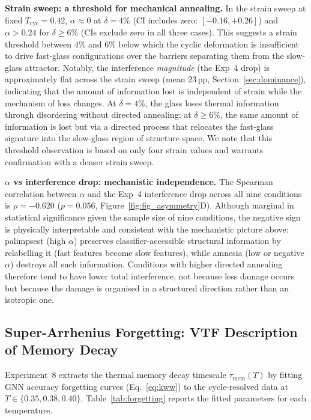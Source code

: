 \documentclass[12pt,a4paper]{article}
\newcommand{\Tbat}{T_{\mathrm{cyc}}}
\newcommand{\degpp}{\,\text{pp}}
\newcommand{\vtau}{\tau_{\mathrm{mem}}}
\begin{document}
\textbf{Strain sweep: a threshold for mechanical annealing.}
In the strain sweep at fixed $\Tbat = 0.42$, $\alpha \approx 0$ at $\delta = 4\%$ (CI includes zero: $[-0.16, +0.26]$) and $\alpha > 0.24$ for $\delta \geq 6\%$ (CIs exclude zero in all three cases).
This suggests a strain threshold between $4\%$ and $6\%$ below which the cyclic deformation is insufficient to drive fast-glass configurations over the barriers separating them from the slow-glass attractor.
Notably, the interference \emph{magnitude} (the Exp~4 drop) is approximately flat across the strain sweep (mean $23\degpp$, Section~\ref{sec:dominance}), indicating that the amount of information lost is independent of strain while the mechanism of loss changes.
At $\delta = 4\%$, the glass loses thermal information through disordering without directed annealing; at $\delta \geq 6\%$, the same amount of information is lost but via a directed process that relocates the fast-glass signature into the slow-glass region of structure space.
We note that this threshold observation is based on only four strain values and warrants confirmation with a denser strain sweep.
 
\textbf{$\alpha$ vs interference drop: mechanistic independence.}
The Spearman correlation between $\alpha$ and the Exp~4 interference drop across all nine conditions is $\rho = -0.620$ ($p = 0.056$, Figure~\ref{fig:fig_asymmetry}D).
Although marginal in statistical significance given the sample size of nine conditions, the negative sign is physically interpretable and consistent with the mechanistic picture above: palimpsest (high $\alpha$) preserves classifier-accessible structural information by relabelling it (fast features become slow features), while amnesia (low or negative $\alpha$) destroys all such information.
Conditions with higher directed annealing therefore tend to have lower total interference, not because less damage occurs but because the damage is organised in a structured direction rather than an isotropic one.

\subsection{Super-Arrhenius Forgetting: VTF Description of Memory Decay}
\label{sec:forgetting}
 
Experiment~8 extracts the thermal memory decay timescale $\vtau(T)$ by fitting GNN accuracy forgetting curves (Eq.~\ref{eq:kww}) to the cycle-resolved data at $T \in \{0.35, 0.38, 0.40\}$.
Table~\ref{tab:forgetting} reports the fitted parameters for each temperature.
 
\end{document}
